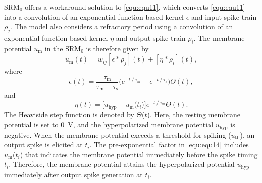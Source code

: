\documentclass[10pt,journal]{IEEEtran}
\begin{document}
SRM$_\textrm{0}$ \cite{gerstner2002spiking} offers a workaround solution to \eqref{equ:equ11}, which converts \eqref{equ:equ11} into a convolution of an exponential function-based kernel $\epsilon$ and input spike train $\rho_j$. 
The model also considers a refractory period using a convolution of an exponential function-based kernel $\eta$ and output spike train $\rho_i$.
The membrane potential $u_\textrm{m}$ in the SRM$_\textrm{0}$ is therefore given by
\begin{equation}\label{equ:equ12}
    u_\textrm{m}(t) = w_{ij}[\epsilon\ast\rho_{j}](t)+[\eta \ast\rho_i](t),
\end{equation}
where 
\begin{equation}\label{equ:equ13}
    \epsilon(t) =\frac{\tau_\textrm{m}}{\tau_\textrm{m}-\tau_\textrm{s}} \big(e^{-t\mathbin{/}\tau_\textrm{m}}- e^{-t\mathbin{/}\tau_\textrm{s}}\big) \Theta(t),
\end{equation}
and 
\begin{equation}\label{equ:equ14}
    \eta(t)=\Big[u_\textrm{hyp}-u_\textrm{m} \Big(t_i\Big)\Big] e^{-t\mathbin{/}\tau_\textrm{m}}\Theta(t).
\end{equation}
The Heaviside step function is denoted by $\Theta$($t$).
Here, the resting membrane potential is set to 0~V, and the hyperpolarized membrane potential $u_\textrm{hyp}$ is negative. 
When the membrane potential exceeds a threshold for spiking ($u_\textrm{th}$), an output spike is elicited at $t_i$.  
The pre-exponential factor in \eqref{equ:equ14} includes $u_\textrm{m}$($t_i$) that indicates the membrane potential immediately before the spike timing $t_i$.
Therefore, the membrane potential attains the hyperpolarized potential $u_\textrm{hyp}$ immediately after output spike generation at $t_i$.
\end{document}
